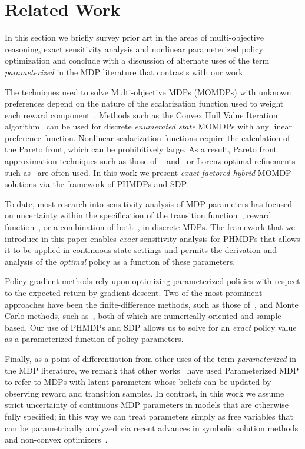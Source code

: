 \section{Related Work}
\label{sec:background}

In this section we briefly survey prior art in the areas of multi-objective reasoning, exact sensitivity analysis and nonlinear parameterized policy optimization and conclude with a discussion of alternate uses of the term \emph{parameterized} in the MDP literature that contrasts with our work.

The techniques used to solve Multi-objective MDPs (MOMDPs) with unknown preferences depend on the nature of the scalarization function used to weight each reward component~\cite{Roijers_JAIR_2013}. Methods such as the Convex Hull Value Iteration algorithm~\cite{Barrett_ICML_2008} can be used for discrete \emph{enumerated state} MOMDPs with any linear preference function. Nonlinear scalarization functions require the calculation of the Pareto front, which can be prohibitively large. As a result, Pareto front approximation techniques such as those of ~\cite{Chatterjee_STACS_2006} and~\cite{Pirotta_AAAI_2015} or Lorenz optimal refinements such as~\cite{Perny_AAAI_2013} are often used. In this work we present \textit{exact} \emph{factored hybrid} MOMDP solutions via the framework of PHMDPs and SDP.

To date, most research into sensitivity analysis of MDP parameters has focused on uncertainty within the specification of the transition function~\cite{Kalyanasundaram_AJC_2004}, reward function~\cite{Tan_JAP_2011}, or a combination of both~\cite{Givan_AI_2000}, in discrete MDPs. The framework that we introduce in this paper enables \textit{exact} sensitivity analysis for PHMDPs that allows it to be applied in continuous state settings and permits the derivation and analysis of the \emph{optimal} policy as a function of these parameters.

Policy gradient methods rely upon optimizing parameterized policies with respect to the expected return by gradient descent. 
Two of the most prominent approaches have been the finite-difference methods, such as those of~\cite{Ng_UAI_2000}, and Monte Carlo methods, such as~\cite{Sutton_NIPS_1999,Baxter_ISCAS_2000}, both of which are numerically oriented and sample based. Our use of PHMDPs and SDP allows us to solve for an \textit{exact} policy value as a parameterized function of policy parameters.

Finally, as a point of differentiation from other uses of the term \emph{parameterized} in the MDP literature, we remark that other works~\cite{Doshi-VelezK16,Duff_UMA_2002,Dearden_UAI_1999,Gopalan_COLT_2015} have used Parameterized MDP to refer to MDPs with latent parameters whose beliefs can be updated by observing reward and transition samples. In contrast, in this work we assume strict uncertainty of continuous MDP parameters in models that are otherwise fully specified; in this way we can treat parameters simply as free variables that can be parametrically analyzed via recent advances in symbolic solution methods and non-convex optimizers~\cite{Gao2013}.


